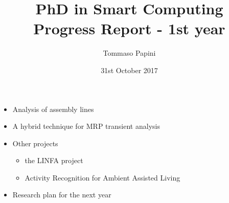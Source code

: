
\title[PhD in Smart Computing - Progress Report - 1st year]{
  PhD in Smart Computing\\
  Progress Report - 1st year
}
\author{
  Tommaso Papini
}
\date{
  31st October 2017
}
  
\begin{frame}
  \titlepage
  
  \begin{itemize}
    \item Analysis of assembly lines
    \item A hybrid technique for MRP transient analysis
    \item Other projects
    \begin{itemize}
      \item the LINFA project
      \item Activity Recognition for Ambient Assisted Living
    \end{itemize}
    \item Research plan for the next year
  \end{itemize}
\end{frame}